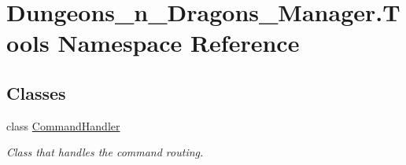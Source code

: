 \hypertarget{namespace_dungeons__n___dragons___manager_1_1_tools}{}\section{Dungeons\+\_\+n\+\_\+\+Dragons\+\_\+\+Manager.\+Tools Namespace Reference}
\label{namespace_dungeons__n___dragons___manager_1_1_tools}
\subsection*{Classes}
\begin{DoxyCompactItemize}
\item 
class \mbox{\hyperlink{class_dungeons__n___dragons___manager_1_1_tools_1_1_command_handler}{Command\+Handler}}
\begin{DoxyCompactList}\small\item\em Class that handles the command routing. \end{DoxyCompactList}\end{DoxyCompactItemize}
